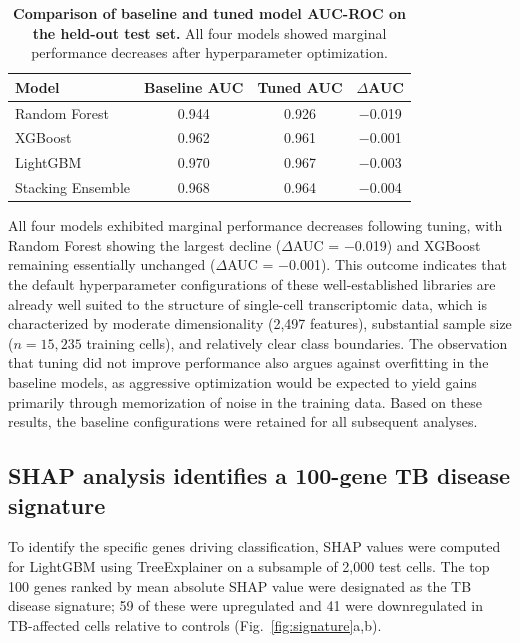 \documentclass[12pt]{article}
\begin{document}
\begin{table}[!ht]
\centering
\caption{\textbf{Comparison of baseline and tuned model AUC-ROC on the held-out test set.} All four models showed marginal performance decreases after hyperparameter optimization.}
\label{tab:tuning}
\begin{tabular}{lccc}
\toprule
\textbf{Model} & \textbf{Baseline AUC} & \textbf{Tuned AUC} & \textbf{$\Delta$AUC} \\
\midrule
Random Forest     & 0.944 & 0.926 & $-$0.019 \\
XGBoost           & 0.962 & 0.961 & $-$0.001 \\
LightGBM          & 0.970 & 0.967 & $-$0.003 \\
Stacking Ensemble & 0.968 & 0.964 & $-$0.004 \\
\bottomrule
\end{tabular}
\end{table}

All four models exhibited marginal performance decreases following tuning, with Random Forest showing the largest decline ($\Delta$AUC = $-$0.019) and XGBoost remaining essentially unchanged ($\Delta$AUC = $-$0.001). This outcome indicates that the default hyperparameter configurations of these well-established libraries are already well suited to the structure of single-cell transcriptomic data, which is characterized by moderate dimensionality (2,497 features), substantial sample size ($n = 15{,}235$ training cells), and relatively clear class boundaries. The observation that tuning did not improve performance also argues against overfitting in the baseline models, as aggressive optimization would be expected to yield gains primarily through memorization of noise in the training data. Based on these results, the baseline configurations were retained for all subsequent analyses.

\subsection*{SHAP analysis identifies a 100-gene TB disease signature}

To identify the specific genes driving classification, SHAP values were computed for LightGBM using TreeExplainer\cite{lundberg2020} on a subsample of 2,000 test cells. The top 100 genes ranked by mean absolute SHAP value were designated as the TB disease signature; 59 of these were upregulated and 41 were downregulated in TB-affected cells relative to controls (Fig.~\ref{fig:signature}a,b).
\end{document}
